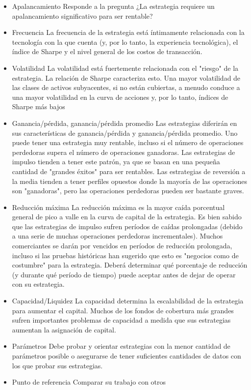 \documentclass{article}
\begin{document}
\begin{itemize}
\begin{itemize}
\item Apalancamiento
Responde a la pregunta ¿La estrategia requiere un apalancamiento significativo para ser rentable?
\item Frecuencia
La frecuencia de la estrategia está íntimamente relacionada con la tecnología con la que cuenta (y, por lo tanto, la experiencia tecnológica), el índice de Sharpe y el nivel general de los costos de transacción.
\item  Volatilidad
La volatilidad está fuertemente relacionada con el "riesgo" de la estrategia. La relación de Sharpe caracteriza esto. Una mayor volatilidad de las clases de activos subyacentes, si no están cubiertas, a menudo conduce a una mayor volatilidad en la curva de acciones y, por lo tanto, índices de Sharpe más bajos
\item Ganancia/pérdida, ganancia/pérdida promedio
Las estrategias diferirán en sus características de ganancia/pérdida y ganancia/pérdida promedio. Uno puede tener una estrategia muy rentable, incluso si el número de operaciones perdedoras supera el número de operaciones ganadoras.
Las estrategias de impulso tienden a tener este patrón, ya que se basan en una pequeña cantidad de "grandes éxitos" para ser rentables.
Las estrategias de reversión a la media tienden a tener perfiles opuestos donde la mayoría de las operaciones son "ganadoras", pero las operaciones perdedoras pueden ser bastante graves.
\item Reducción máxima
La reducción máxima es la mayor caída porcentual general de pico a valle en la curva de capital de la estrategia. Es bien sabido que las estrategias de impulso sufren períodos de caídas prolongadas (debido a una serie de muchas operaciones perdedoras incrementales). Muchos comerciantes se darán por vencidos en períodos de reducción prolongada, incluso si las pruebas históricas han sugerido que esto es "negocios como de costumbre" para la estrategia. Deberá determinar qué porcentaje de reducción (y durante qué período de tiempo) puede aceptar antes de dejar de operar con su estrategia.

\item Capacidad/Liquidez
La capacidad determina la escalabilidad de la estrategia para aumentar el capital. Muchos de los fondos de cobertura más grandes sufren importantes problemas de capacidad a medida que sus estrategias aumentan la asignación de capital.
\item  Parámetros
 Debe probar y orientar estrategias con la menor cantidad de parámetros posible o asegurarse de tener suficientes cantidades de datos con los que probar sus estrategias.
\item Punto de referencia
Comparar su trabajo con otros
\end{itemize}
\end{itemize}
\end{document}
